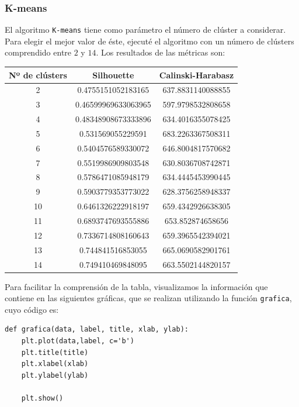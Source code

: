 \documentclass[a4]{article}
\begin{document}
\subsubsection{K-means}

El algoritmo \texttt{K-means} tiene como parámetro el número de clúster a considerar. Para elegir el mejor valor de éste, ejecuté el algoritmo con un número de clústers comprendido entre $2$ y $14$. Los resultados de las métricas son:

\begin{center}
\begin{tabular}{|c|c|c|}
\hline
\multicolumn{1}{|c|}{\textbf{Nº de clústers}}& \textbf{Silhouette} & \textbf{Calinski-Harabasz}\\ \hline
  2  & 0.4755151052183165  & 637.8831140088855  \\ \hline
  3  & 0.46599969633063965 & 597.9798532808658  \\ \hline
  4  & 0.48348908673333896 & 634.4016355078425  \\ \hline
  5  & 0.531569055229591   & 683.2263367508311  \\ \hline
  6  & 0.5404576589330072  & 646.8004817570682  \\ \hline
  7  & 0.5519986909803548  & 630.8036708742871  \\ \hline
  8  & 0.5786471085948179  & 634.4445453990445  \\ \hline
  9  & 0.5903779353773022  & 628.3756258948337  \\ \hline
 10  & 0.6461326222918197  & 659.4342926638305  \\ \hline
 11  & 0.6893747693555886  & 653.852874658656   \\ \hline
 12  & 0.7336714808160643  & 659.3965542394021  \\ \hline
 13  & 0.744841516853055   & 665.0690582901761  \\ \hline
 14  & 0.749410469848095   & 663.5502144820157  \\ \hline
\end{tabular}
\end{center}

Para facilitar la comprensión de la tabla, visualizamos la información que contiene en las siguientes gráficas, que se realizan utilizando la función \texttt{grafica}, cuyo código es:

\begin{lstlisting}
def grafica(data, label, title, xlab, ylab):
    plt.plot(data,label, c='b')
    plt.title(title)
    plt.xlabel(xlab)
    plt.ylabel(ylab)

    plt.show()
  \end{lstlisting}
\end{document}
